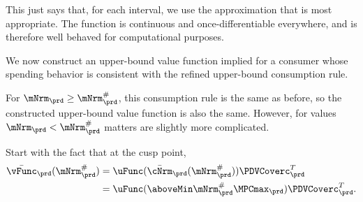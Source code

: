   This just says that, for each interval, we use the approximation that
  is most appropriate.  The function is continuous and
  once-differentiable everywhere, and is therefore well behaved for
  computational purposes.
  \begin{comment}
    In practice, in our problem the difference due to this refinement is displayed in Figure \ref{fig:IntExpFOCInvPesReaOpt45GapPlot}.
    \hypertarget{IntExpFOCInvPesReaOpt45GapPlot}{}
    \begin{figure}
      \texttt{[image: ./Figures/IntExpFOCInvPesReaOpt45GapPlot]}
      \caption{Difference Between $\Aprx{\Hi{\cFunc}}_{L, T-1}$ and $\Aprx{\Hi{\cFunc}}_{H,T-1}$ is Small}
      \label{fig:IntExpFOCInvPesReaOpt45GapPlot}
    \end{figure}
  \end{comment}

  We now construct an upper-bound value function implied for a consumer whose spending behavior is consistent with the refined upper-bound consumption rule.

  For $\mNrm_{\prd} \geq \mNrm_{\prd}^{\#}$, this consumption rule is the same as before,
  so the constructed upper-bound value function is also the same.  However, for
  values $\mNrm_{\prd} < \mNrm_{\prd}^{\#}$ matters are slightly more complicated.

  Start with the fact that at the cusp point,
  \begin{equation*}\begin{gathered}\begin{aligned}
        \bar{\vFunc}_{\prd}(\mtCusp)  & = \uFunc(\bar{\cNrm}_{\prd}(\mtCusp))\PDVCoverc_{\prd}^T \\
        & =  \uFunc(\aboveMin \mtCusp  \MPCmax_{\prd})\PDVCoverc_{\prd}^{T}
        .
      \end{aligned}\end{gathered}\end{equation*}

